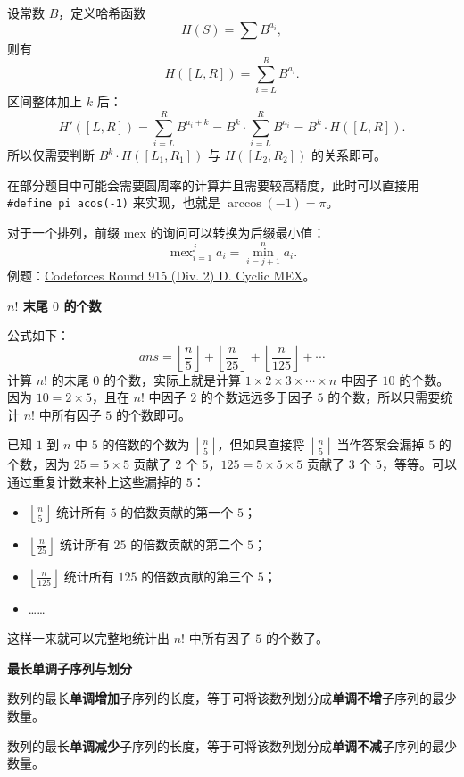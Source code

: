 设常数 $B$，定义哈希函数
\[
H(S)=\sum B^{a_i},
\]
则有
\[
H([L,R])=\sum_{i=L}^{R}B^{a_i}.
\]
区间整体加上 $k$ 后：
\[
H'([L,R])=\sum_{i=L}^{R}B^{a_i+k}=B^k\cdot\sum_{i=L}^{R}B^{a_i}=B^k\cdot H([L,R]).
\]
所以仅需要判断 $B^k\cdot H([L_1,R_1])$ 与 $H([L_2,R_2])$ 的关系即可。

在部分题目中可能会需要圆周率的计算并且需要较高精度，此时可以直接用 \verb|#define pi acos(-1)| 来实现，也就是 $\arccos(-1)=\pi$。

对于一个排列，前缀 mex 的询问可以转换为后缀最小值：
\[
\operatorname{mex}_{i=1}^j a_i = \min_{i=j+1}^n a_i.
\]
例题：\href{https://codeforces.com/contest/1905/problem/D}{Codeforces Round 915 (Div. 2) D. Cyclic MEX}。

\par\medskip\noindent\textbf{$n!$ 末尾 $0$ 的个数}\par\smallskip
公式如下：
\[
ans = \left\lfloor \frac{n}{5} \right\rfloor + \left\lfloor \frac{n}{25} \right\rfloor + \left\lfloor \frac{n}{125} \right\rfloor + \cdots
\]
计算 $n!$ 的末尾 $0$ 的个数，实际上就是计算 $1\times 2\times 3\times \cdots \times n$ 中因子 $10$ 的个数。因为 $10=2\times 5$，且在 $n!$ 中因子 $2$ 的个数远远多于因子 $5$ 的个数，所以只需要统计 $n!$ 中所有因子 $5$ 的个数即可。

已知 $1$ 到 $n$ 中 $5$ 的倍数的个数为 $\left\lfloor \frac{n}{5} \right\rfloor$，但如果直接将 $\left\lfloor \frac{n}{5} \right\rfloor$ 当作答案会漏掉 $5$ 的个数，因为 $25=5\times 5$ 贡献了 $2$ 个 $5$，$125=5\times 5\times 5$ 贡献了 $3$ 个 $5$，等等。可以通过重复计数来补上这些漏掉的 $5$：
\begin{itemize}
  \item $\left\lfloor \frac{n}{5} \right\rfloor$ 统计所有 $5$ 的倍数贡献的第一个 $5$；
  \item $\left\lfloor \frac{n}{25} \right\rfloor$ 统计所有 $25$ 的倍数贡献的第二个 $5$；
  \item $\left\lfloor \frac{n}{125} \right\rfloor$ 统计所有 $125$ 的倍数贡献的第三个 $5$；
  \item ……
\end{itemize}
这样一来就可以完整地统计出 $n!$ 中所有因子 $5$ 的个数了。

\par\medskip\noindent\textbf{最长单调子序列与划分}\par\smallskip
数列的最长\textbf{单调增加}子序列的长度，等于可将该数列划分成\textbf{单调不增}子序列的最少数量。

数列的最长\textbf{单调减少}子序列的长度，等于可将该数列划分成\textbf{单调不减}子序列的最少数量。

